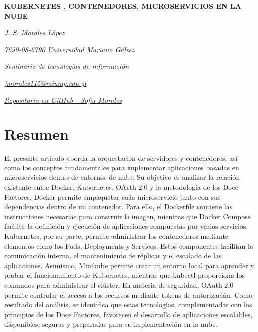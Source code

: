 \documentclass[12pt]{article}
\author{Jenny Sofía Morales}
\begin{document}
	
	\begin{center}
		
		{\bfseries\fontsize{12}{14}\selectfont
			KUBERNETES , CONTENEDORES, MICROSERVICIOS EN LA NUBE
		}
		
		\vspace{0.4cm}
		
		{\itshape J. S. Morales López}
		
		\vspace{0.2cm}
		
		{\itshape 7690-08-6790 Universidad Mariano Gálvez}
		
		{\itshape Seminario de tecnologías de información}
		
		{\itshape
			\href{mailto:jmorales115@miumg.edu.gt}
			{jmorales115@miumg.edu.gt}
		}
		
		{\itshape 
			\href{https://github.com/sofiaMorales3805/ForoAcademico-Seminario}
			{Repositorio en GitHub - Sofia Morales} 
		}
	\end{center}
	
	\vspace{0.5cm}
	\section*{Resumen}
	
	
	El presente artículo aborda la orquestación de servidores y contenedores, así como los conceptos fundamentales para implementar aplicaciones basadas en microservicios dentro de entornos de nube. Su objetivo es analizar la relación existente entre Docker, Kubernetes, OAuth 2.0 y la metodología de los Doce Factores. Docker permite empaquetar cada microservicio junto con sus dependencias dentro de un contenedor. Para ello, el Dockerfile contiene las instrucciones necesarias para construir la imagen, mientras que Docker Compose facilita la definición y ejecución de aplicaciones compuestas por varios servicios. Kubernetes, por su parte, permite administrar los contenedores mediante elementos como los Pods, Deployments y Services. Estos componentes facilitan la comunicación interna, el mantenimiento de réplicas y el escalado de las aplicaciones. Asimismo, Minikube permite crear un entorno local para aprender y probar el funcionamiento de Kubernetes, mientras que kubectl proporciona los comandos para administrar el clúster. En materia de seguridad, OAuth 2.0 permite controlar el acceso a los recursos mediante tokens de autorización. Como resultado del análisis, se identifica que estas tecnologías, complementadas con los principios de los Doce Factores, favorecen el desarrollo de aplicaciones escalables, disponibles, seguras y preparadas para su implementación en la nube.
	
\end{document}
